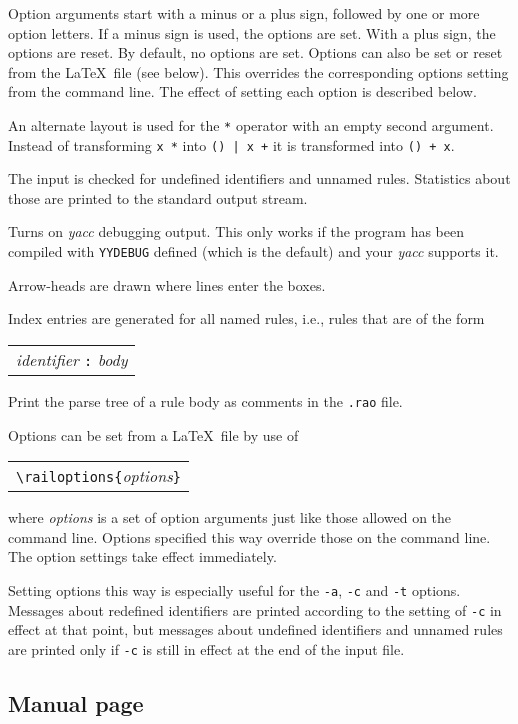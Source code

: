 \documentclass[a4paper]{article}
\newcommand\nt[1]{\textit{#1}}
\newcommand\lit[1]{\texttt{#1}}
\newenvironment{example}%
{\begin{trivlist}\item[]\begin{tabular}{l}}%
{\end{tabular}\end{trivlist}}
\begin{document}
Option arguments start with a minus or a plus sign, followed by one or
more option letters. If a minus sign is used, the options are set.
With a plus sign, the options are reset. By default, no options are set.
Options can also be set or reset from the \LaTeX\ file (see below).
This overrides the corresponding options setting from the command line.
The effect of setting each option is described below.
\begin{description}
\item[\lit{-a}]
An alternate layout is used for the \verb!*! operator with an empty
second argument. Instead of transforming \verb!x *! into \verb!() | x +!
it is transformed into \verb!() + x!.
\item[\lit{-c}]
The input is checked for undefined identifiers and unnamed rules.
Statistics about those are printed to the standard output stream.
\item[\lit{-d}]
Turns on \textit{yacc} debugging output. This only works if the program
has been compiled with \verb!YYDEBUG! defined (which is the default) and
your \textit{yacc} supports it.
\item[\lit{-h}]
Arrow-heads are drawn where lines enter the boxes.
\item[\lit{-i}]
Index entries are generated for all named rules, i.e., rules that are of
the form
\begin{example}
\nt{identifier} \lit{:} \nt{body}
\end{example}
\item[\lit{-t}]
Print the parse tree of a rule body as comments in the \verb!.rao! file.
\end{description}
Options can be set from a \LaTeX\ file by use of
\begin{example}
\verb!\railoptions{!\nt{options}\verb!}!
\end{example}
where \nt{options} is a set of option arguments just like
those allowed on the command line. Options specified this way override
those on the command line. The option settings take effect immediately.

Setting options this way is especially useful for the \lit{-a}, \lit{-c}
and \lit{-t} options. Messages about redefined identifiers
are printed according to the setting of \lit{-c} in effect at that
point, but messages about undefined identifiers and unnamed rules are
printed only if \lit{-c} is still in effect at the end of the input
file.

\subsection{Manual page}
\end{document}
